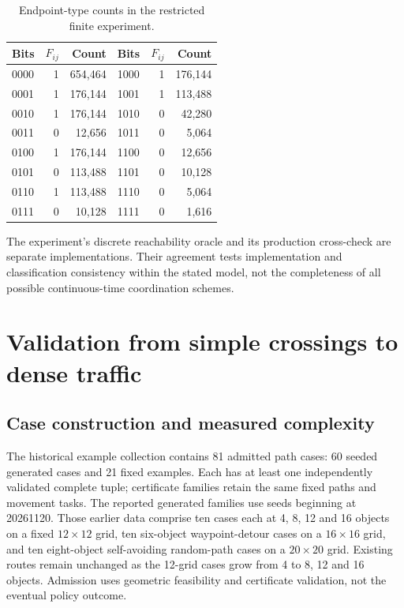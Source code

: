 \documentclass[11pt,a4paper]{article}
\theoremstyle{remark}
\begin{document}
\begin{table}[htbp]
\centering
\caption{Endpoint-type counts in the restricted finite experiment.}
\label{tab:classification}
\begin{tabular}{lrr@{\qquad}lrr}
\toprule
Bits & $F_{ij}$ & Count & Bits & $F_{ij}$ & Count\\
\midrule
0000 & 1 & 654,464 & 1000 & 1 & 176,144\\
0001 & 1 & 176,144 & 1001 & 1 & 113,488\\
0010 & 1 & 176,144 & 1010 & 0 & 42,280\\
0011 & 0 & 12,656 & 1011 & 0 & 5,064\\
0100 & 1 & 176,144 & 1100 & 0 & 12,656\\
0101 & 0 & 113,488 & 1101 & 0 & 10,128\\
0110 & 1 & 113,488 & 1110 & 0 & 5,064\\
0111 & 0 & 10,128 & 1111 & 0 & 1,616\\
\bottomrule
\end{tabular}
\end{table}

The experiment's discrete reachability oracle and its production cross-check
are separate implementations. Their agreement tests implementation and
classification consistency within the stated model, not the completeness of
all possible continuous-time coordination schemes.

\section{Validation from simple crossings to dense traffic}
\label{sec:validation}
\subsection{Case construction and measured complexity}
The historical example collection contains 81 admitted path cases: 60 seeded generated cases and
21 fixed examples. Each has at least one independently validated complete
tuple; certificate families retain the same fixed paths and movement
tasks. The reported generated families use seeds beginning at 20261120.
Those earlier data comprise ten cases each at 4, 8, 12 and 16 objects on a fixed
$12\times12$ grid, ten six-object waypoint-detour cases on a $16\times16$
grid, and ten eight-object self-avoiding random-path cases on a
$20\times20$ grid. Existing routes remain unchanged as the 12-grid cases
grow from 4 to 8, 12 and 16 objects. Admission uses geometric feasibility
and certificate validation, not the eventual policy outcome.
\end{document}
